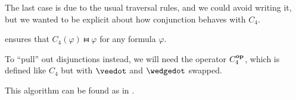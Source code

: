 \begin{algorithm}
\begin{thmenum}
    The last case is due to the usual traversal rules, and we could avoid writing it, but we wanted to be explicit about how conjunction behaves with \( C_4 \).

     ensures that \( C_4(\varphi) \gleichstark \varphi \) for any formula \( \varphi \).

    To \enquote{pull} out disjunctions instead, we will need the operator \( C_4^\oppos \), which is defined like \( C_4 \) but with \( \synvee \) and \( \synwedge \) swapped.
  \end{thmenum}
\end{algorithm}
\begin{comments}
  \item This algorithm can be found as  in \cite{notebook:code}.
\end{comments}
